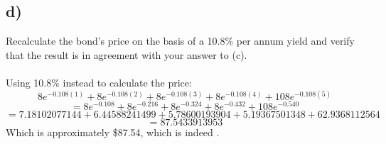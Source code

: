 \documentclass{article}
\begin{document}
{\subsection*{d)}

Recalculate the bond's price on the basis of a 10.8\% per annum yield and verify that the result is in agreement with your answer to (c). \\ \\ 
Using 10.8\% instead to calculate the price:
\[
  8e^{-0.108(1)} + 8e^{-0.108(2)} + 8e^{-0.108(3)} + 8e^{-0.108(4)} + 108e^{-0.108(5)}
\]
\[
  = 8e^{-0.108} + 8e^{-0.216} + 8e^{-0.324} + 8e^{-0.432} + 108e^{-0.540}
\]
\[
  = 7.18102077144 + 6.44588241499 + 5.78600193904 + 5.19367501348 + 62.9368112564
\]
\[
  = 87.5433913953
\]
Which is approximately \$87.54, which is indeed .

}
\end{document}
